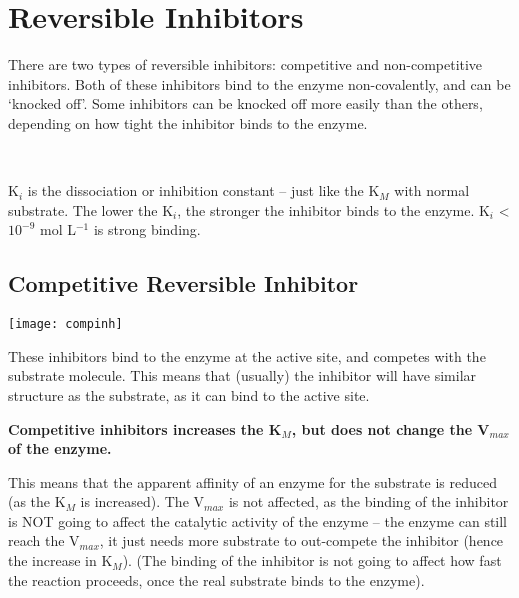 \documentclass[a4paper, 12pt]{report}
\begin{document}
\section{Reversible Inhibitors}

There are two types of reversible inhibitors: competitive and non-competitive inhibitors.
Both of these inhibitors bind to the enzyme non-covalently, and can be `knocked off'.
Some inhibitors can be knocked off more easily than the others, depending on how tight the inhibitor binds to the enzyme.

\begin{center}
\\

\vspace{0.5cm}

\end{center}

K$_i$ is the dissociation or inhibition constant -- just like the K$_M$ with normal substrate.
The lower the K$_i$, the stronger the inhibitor binds to the enzyme.
K$_i$ \textless{} $10^{-9}$ mol L$^{-1}$ is strong binding.

\subsection{Competitive Reversible Inhibitor}

\begin{center}
\texttt{[image: compinh]}
\end{center}

These inhibitors bind to the enzyme at the active site, and competes with the substrate molecule.
This means that (usually) the inhibitor will have similar structure as the substrate, as it can bind to the active site.

\begin{center}
\textbf{Competitive inhibitors increases the K$_M$, but does not change the V$_{max}$ of the enzyme.}
\end{center}

This means that the apparent affinity of an enzyme for the substrate is reduced (as the K$_M$ is increased).
The V$_{max}$ is not affected, as the binding of the inhibitor is NOT going to affect the catalytic activity of the enzyme -- the enzyme can still reach the V$_{max}$, it just needs more substrate to out-compete the inhibitor (hence the increase in K$_M$).
(The binding of the inhibitor is not going to affect how fast the reaction proceeds, once the real substrate binds to the enzyme).
\end{document}
